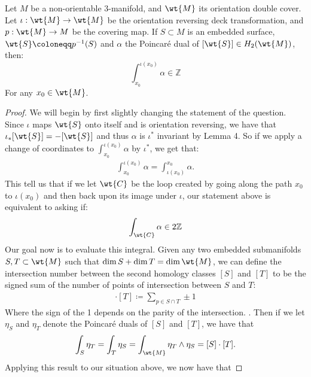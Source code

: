 \begin{lem}
    Let $M$ be a non-orientable $3$-manifold, and $\wt{M}$ its orientation double cover. Let $\iota: \wt{M} \to \wt{M}$ be the orientation reversing deck transformation, and $p: \wt{M} \to M$ be the covering map. If $S \subset M$ is an embedded surface, $\wt{S} \coloneqq p^{-1}(S)$ and $\alpha$ the Poincar\'e dual of $[\wt{S}] \in H_2(\wt{M})$, then:
    $$\int_{x_0}^{\iota(x_0)} \alpha \in \mathbb{Z}$$ For any $x_0 \in \wt{M}$.
\end{lem}
\begin{proof}
    We will begin by first slightly changing the statement of the question. Since $\iota$ maps $\wt{S}$ onto itself and is orientation reversing, we have that $\iota_*[\wt{S}] = -[\wt{S}]$ and thus $\alpha$ is $\iota^*$ invariant by Lemma 4. So if we apply a change of coordinates to $\int_{x_0}^{\iota(x_0)} \alpha$ by $\iota^*$, we get that:
    \begin{align*}
        \int_{x_0}^{\iota(x_0)} \alpha = \int_{\iota(x_0)}^{x_0} \alpha.
    \end{align*}
    This tell us that if we let $\wt{C}$ be the loop created by going along the path $x_0$ to $\iota(x_0)$ and then back upon its image under $\iota$, our statement above is equivalent to asking if:
    \begin{align*}
        \int_{\wt{C}} \alpha \in 2\mathbb{Z}
    \end{align*}
    Our goal now is to evaluate this integral. Given any two embedded submanifolds $ S,T \subset \wt{M}$ such that $\dim S + \dim T = \dim \wt{M}$, we can define the intersection number between the second homology classes $[S]$ and $[T]$ to be the signed sum of the number of points of intersection between $S$ and $T$:
    \begin{align}
        [S] \cdot [T] \coloneqq \sum_{p \in S \cap T} \pm 1
    \end{align}
    Where the sign of the 1 depends on the parity of the intersection. . Then if we let $\eta_S$ and $\eta_T$ denote the Poincar\'e duals of $[S]$ and $[T]$, we have that
    \begin{align*}
        \int_S \eta_T = \int_T \eta_S = \int_{\wt{M}} \eta_T \wedge \eta_S = [S] \cdot [T].
    \end{align*}
    Applying this result to our situation above, we now have that

\end{proof}
